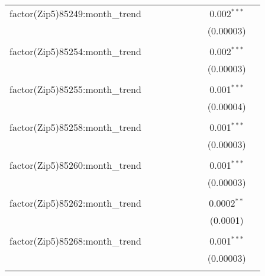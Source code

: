 \begin{table}[H]
{\begin{tabular}{@{\extracolsep{5pt}}lcccccccc}
  factor(Zip5)85249:month\_trend &  &  &  &  &  &  & 0.002$^{***}$ &  \\  

   &  &  &  &  &  &  & (0.00003) &  \\  

   & & & & & & & & \\  

  factor(Zip5)85254:month\_trend &  &  &  &  &  &  & 0.002$^{***}$ &  \\  

   &  &  &  &  &  &  & (0.00003) &  \\  

   & & & & & & & & \\  

  factor(Zip5)85255:month\_trend &  &  &  &  &  &  & 0.001$^{***}$ &  \\  

   &  &  &  &  &  &  & (0.00004) &  \\  

   & & & & & & & & \\  

  factor(Zip5)85258:month\_trend &  &  &  &  &  &  & 0.001$^{***}$ &  \\  

   &  &  &  &  &  &  & (0.00003) &  \\  

   & & & & & & & & \\  

  factor(Zip5)85260:month\_trend &  &  &  &  &  &  & 0.001$^{***}$ &  \\  

   &  &  &  &  &  &  & (0.00003) &  \\  

   & & & & & & & & \\  

  factor(Zip5)85262:month\_trend &  &  &  &  &  &  & 0.0002$^{**}$ &  \\  

   &  &  &  &  &  &  & (0.0001) &  \\  

   & & & & & & & & \\  

  factor(Zip5)85268:month\_trend &  &  &  &  &  &  & 0.001$^{***}$ &  \\  

   &  &  &  &  &  &  & (0.00003) &  \\  

   & & & & & & & & \\  


\end{tabular}}
\end{table}
